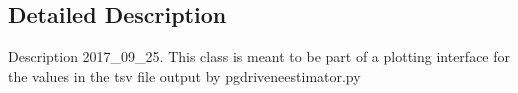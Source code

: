 \subsection{Detailed Description}
\begin{DoxyVerb}Description
2017_09_25.  This class is meant to be part of a plotting
interface for the values in the tsv file output by 
pgdriveneestimator.py
\end{DoxyVerb}
 